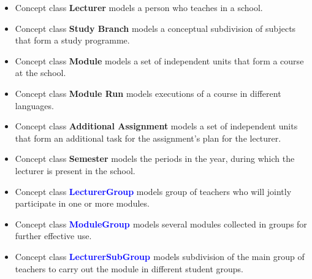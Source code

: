 \documentclass{scrartcl}
\begin{document}
	    \begin{itemize}
	    \item Concept class \textbf{Lecturer} models a person who teaches in a school.
	     \item Concept class \textbf{Study Branch} models a conceptual subdivision of subjects that form a study programme.
	      \item Concept class \textbf{Module} models a set of independent units that form a course at the school.
	       \item Concept class \textbf{Module Run } models executions of a course in different languages.
	       	      \item Concept class \textbf{Additional Assignment} models a set of independent units that form an additional task for the assignment's plan for the lecturer.
  \item Concept class \textbf{Semester} models the periods in the year, during which the lecturer is present in the school.
  \item Concept class \textbf{\textcolor{blue}{ LecturerGroup}} models   group of teachers who will jointly participate in one or more modules.
   \item Concept class \textbf{\textcolor{blue}{ModuleGroup }}  models
   several modules collected in groups for further effective use.
     \item Concept class \textbf{\textcolor{blue}{LecturerSubGroup }} models subdivision of the main group of teachers to carry out the module in different student groups.
     
	         
	    \end{itemize}
\end{document}
